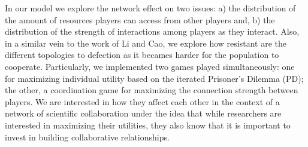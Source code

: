 \documentclass{bmcart}
\begin{document}




{\color{red} In our model we explore the network effect on two issues: a) the distribution of the amount of
resources players can access from other players and, b) the distribution of the strength of
interactions among players as they interact. Also, in a similar
vein to the work of Li and Cao, we explore how resistant are the different
topologies to defection as it becames harder for the population to cooperate.}
Particularly, we implemented two games played simultaneously: one for maximizing
individual utility based on the iterated Prisoner's Dilemma (PD); the other, a
coordination game for maximizing the connection strength between players. We are
interested in how they affect each other in the context of a network of
scientific collaboration under the idea that while researchers are interested in
maximizing their utilities, they also know that it is important to invest in
building collaborative relationships.
\\ %
\end{document}

